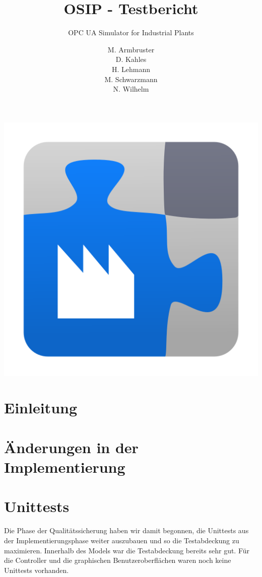 \documentclass[parskip=full]{scrartcl}
\title{OSIP - Testbericht}
\subtitle{OPC UA Simulator for Industrial Plants}
\author{
    M. Armbruster\\
    D. Kahles\\
    H. Lehmann\\
    M. Schwarzmann\\
    N. Wilhelm
}
\begin{document}
\maketitle
\thispagestyle{empty}
\vspace{20px}
\begin{center}
  \includegraphics[scale=0.4]{../icon.png}
\end{center}
\pagebreak
\tableofcontents
\pagebreak

\section{Einleitung}

\section{Änderungen in der Implementierung}

\section{Unittests}
Die Phase der Qualitätssicherung haben wir damit begonnen, die Unittests aus der Implementierungsphase weiter auszubauen und so die Testabdeckung zu maximieren.
Innerhalb des Models war die Testabdeckung bereits sehr gut. Für die Controller und die graphischen Benutzeroberflächen waren noch keine Unittests vorhanden.
\end{document}
